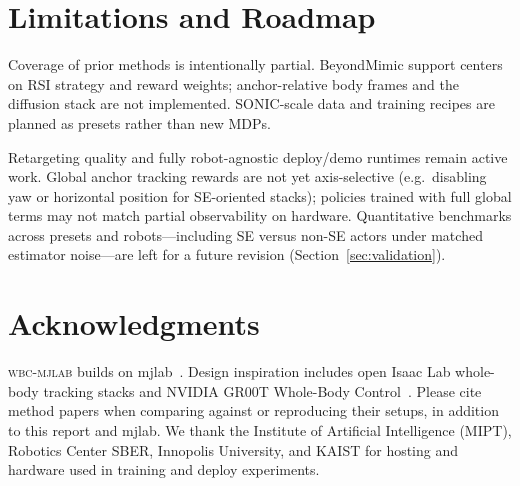 \documentclass[11pt,a4paper]{article}
\begin{document}
\section{Limitations and Roadmap}
\label{sec:limitations}

Coverage of prior methods is intentionally partial. BeyondMimic support centers
on RSI strategy and reward weights; anchor-relative body frames and the
diffusion stack are not implemented. SONIC-scale data and training recipes are
planned as presets rather than new MDPs.

Retargeting quality and fully robot-agnostic deploy/demo runtimes remain active
work. Global anchor tracking rewards are not yet axis-selective (e.g.\ disabling
yaw or horizontal position for SE-oriented stacks); policies trained with full
global terms may not match partial observability on hardware.
Quantitative benchmarks across presets and robots---including SE versus
non-SE actors under matched estimator noise---are left for a future revision
(Section~\ref{sec:validation}).

\section{Acknowledgments}

\textsc{wbc-mjlab} builds on mjlab~\citep{zakka2026mjlab}.
Design inspiration includes open Isaac Lab whole-body tracking stacks and
NVIDIA GR00T Whole-Body Control~\citep{hybridrobotics_wbt,nvlabs_groot_wbc2026}.
Please cite method papers when comparing against or reproducing their setups,
in addition to this report and mjlab. We thank the Institute of Artificial
Intelligence (MIPT), Robotics Center SBER, Innopolis University, and KAIST
for hosting and hardware used in training and deploy experiments.



\end{document}
